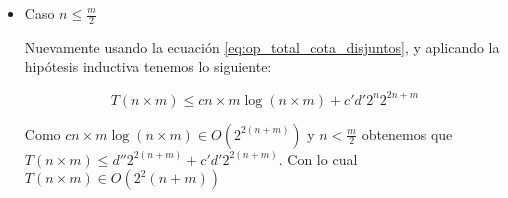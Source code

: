 \documentclass[a4paper, 12pt] {article}
\begin{document}
\begin{itemize}
\item Caso $n \leq \frac{m}{2}$

Nuevamente usando la ecuaci\'on \ref{eq:op_total_cota_disjuntos}, y aplicando la hip\'otesis inductiva tenemos lo siguiente: 

\begin{equation}
T\left( n \times m \right) \leq c n\times m \log \left(n\times m \right) + c'd' 2^{n}2^{2n+m}
\end{equation}


Como $ c n\times m \log \left(n\times m \right) \in O\left( 2^{2\left( n+m\right)}\right)$ y $ n < \frac{m}{2} $ obtenemos que $ T\left( n \times m \right) \leq d''2^{ 2\left( n+m \right)} + c'd' 2^{2\left(n+m \right)}$. Con lo cual $ T\left(n \times m \right) \in O\left(2^2\left( n+m\right) \right)$ 


\end{itemize}
\end{document}
